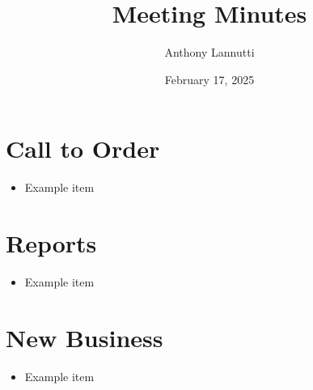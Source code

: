 \documentclass[12pt,a4paper]{article}
\author{Anthony Lannutti}
\date{February 17, 2025}
\title{Meeting Minutes}
\begin{document}
\section*{Call to Order}
\begin{itemize}
\item Example item
\end{itemize}

\section*{Reports}
\begin{itemize}
\item Example item
\end{itemize}

\section*{New Business}
\begin{itemize}
\item Example item
\end{itemize}
\end{document}
